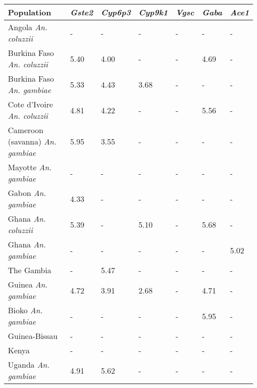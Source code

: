 \begin{tabular}{lllllll}
\toprule
                              Population & \textit{Gste2} & \textit{Cyp6p3} & \textit{Cyp9k1} & \textit{Vgsc} & \textit{Gaba} & \textit{Ace1} \\
\midrule
            Angola \textit{An. coluzzii} &              - &               - &               - &             - &             - &             - \\
      Burkina Faso \textit{An. coluzzii} &           5.40 &            4.00 &               - &             - &          4.69 &             - \\
       Burkina Faso \textit{An. gambiae} &           5.33 &            4.43 &            3.68 &             - &             - &             - \\
     Cote d'Ivoire \textit{An. coluzzii} &           4.81 &            4.22 &               - &             - &          5.56 &             - \\
 Cameroon (savanna) \textit{An. gambiae} &           5.95 &            3.55 &               - &             - &             - &             - \\
            Mayotte \textit{An. gambiae} &              - &               - &               - &             - &             - &             - \\
              Gabon \textit{An. gambiae} &           4.33 &               - &               - &             - &             - &             - \\
             Ghana \textit{An. coluzzii} &           5.39 &               - &            5.10 &             - &          5.68 &             - \\
              Ghana \textit{An. gambiae} &              - &               - &               - &             - &             - &          5.02 \\
                              The Gambia &              - &            5.47 &               - &             - &             - &             - \\
             Guinea \textit{An. gambiae} &           4.72 &            3.91 &            2.68 &             - &          4.71 &             - \\
              Bioko \textit{An. gambiae} &              - &               - &               - &             - &          5.95 &             - \\
                           Guinea-Bissau &              - &               - &               - &             - &             - &             - \\
                                   Kenya &              - &               - &               - &             - &             - &             - \\
             Uganda \textit{An. gambiae} &           4.91 &            5.62 &               - &             - &             - &             - \\
\bottomrule
\end{tabular}
